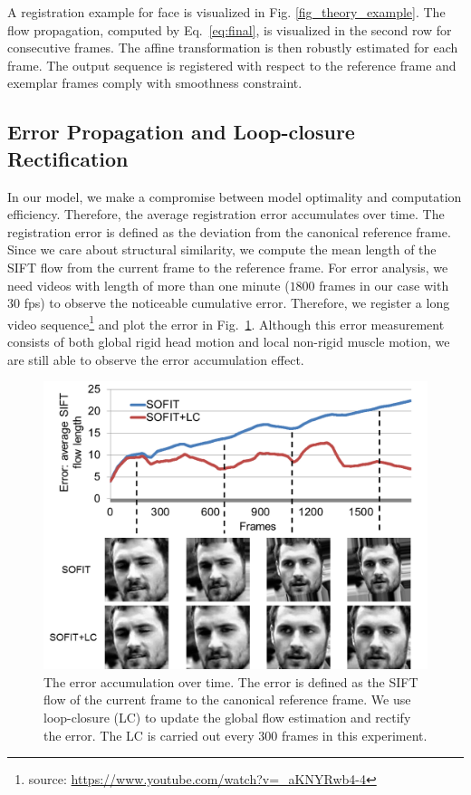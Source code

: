 \documentclass[10pt,journal]{IEEEtran}
\begin{document}
A registration example for face is visualized in Fig. \ref{fig_theory_example}. The flow propagation, computed by Eq.~\eqref{eq:final}, is visualized in the second row for consecutive frames. The affine transformation is then robustly estimated for each frame. The output sequence is registered with respect to the reference frame and exemplar frames comply with smoothness constraint. 


\subsection{\label{sec:details}Error Propagation and Loop-closure Rectification}

In our model, we make a compromise between model optimality and computation efficiency. Therefore, the average registration error accumulates over time. The registration error is defined as the deviation from the canonical reference frame. Since we care about structural similarity, we compute the mean length of the SIFT flow from the current frame to the reference frame. For error analysis, we need videos with length of more than one minute ($1800$ frames in our case with $30$ fps) to observe the noticeable cumulative error. Therefore, we register a long video sequence\footnote{source: \url{https://www.youtube.com/watch?v=_aKNYRwb4-4}} and plot the error in Fig.~\ref{fig_error_prop}. Although this error measurement consists of both global rigid head motion and local non-rigid muscle motion, we are still able to observe the error accumulation effect.

\begin{figure}[htbp]
	\centering
		\includegraphics[width=.9\columnwidth]{fig/error_prop.png}
	\caption{The error accumulation over time. The error is defined as the SIFT flow of the current frame to the canonical reference frame. We use loop-closure (LC) to update the global flow estimation and rectify the error. The LC is carried out every $300$ frames in this experiment.}
	\label{fig_error_prop}
\end{figure}
\end{document}
